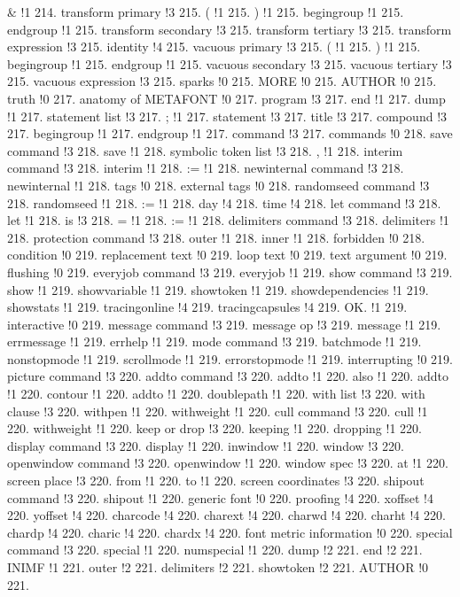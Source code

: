 \& !1 214.
transform primary !3 215.
( !1 215.
) !1 215.
begingroup !1 215.
endgroup !1 215.
transform secondary !3 215.
transform tertiary !3 215.
transform expression !3 215.
identity !4 215.
vacuous primary !3 215.
( !1 215.
) !1 215.
begingroup !1 215.
endgroup !1 215.
vacuous secondary !3 215.
vacuous tertiary !3 215.
vacuous expression !3 215.
sparks !0 215.
MORE !0 215.
AUTHOR !0 215.
truth !0 217.
anatomy of METAFONT !0 217.
program !3 217.
end !1 217.
dump !1 217.
statement list !3 217.
; !1 217.
statement !3 217.
title !3 217.
compound !3 217.
begingroup !1 217.
endgroup !1 217.
command !3 217.
commands !0 218.
save command !3 218.
save !1 218.
symbolic token list !3 218.
, !1 218.
interim command !3 218.
interim !1 218.
:= !1 218.
newinternal command !3 218.
newinternal !1 218.
tags !0 218.
external tags !0 218.
randomseed command !3 218.
randomseed !1 218.
:= !1 218.
day !4 218.
time !4 218.
let command !3 218.
let !1 218.
is !3 218.
= !1 218.
:= !1 218.
delimiters command !3 218.
delimiters !1 218.
protection command !3 218.
outer !1 218.
inner !1 218.
forbidden !0 218.
condition !0 219.
replacement text !0 219.
loop text !0 219.
text argument !0 219.
flushing !0 219.
everyjob command !3 219.
everyjob !1 219.
show command !3 219.
show !1 219.
showvariable !1 219.
showtoken !1 219.
showdependencies !1 219.
showstats !1 219.
tracingonline !4 219.
tracingcapsules !4 219.
OK. !1 219.
interactive !0 219.
message command !3 219.
message op !3 219.
message !1 219.
errmessage !1 219.
errhelp !1 219.
mode command !3 219.
batchmode !1 219.
nonstopmode !1 219.
scrollmode !1 219.
errorstopmode !1 219.
interrupting !0 219.
picture command !3 220.
addto command !3 220.
addto !1 220.
also !1 220.
addto !1 220.
contour !1 220.
addto !1 220.
doublepath !1 220.
with list !3 220.
with clause !3 220.
withpen !1 220.
withweight !1 220.
cull command !3 220.
cull !1 220.
withweight !1 220.
keep or drop !3 220.
keeping !1 220.
dropping !1 220.
display command !3 220.
display !1 220.
inwindow !1 220.
window !3 220.
openwindow command !3 220.
openwindow !1 220.
window spec !3 220.
at !1 220.
screen place !3 220.
from !1 220.
to !1 220.
screen coordinates !3 220.
shipout command !3 220.
shipout !1 220.
generic font !0 220.
proofing !4 220.
xoffset !4 220.
yoffset !4 220.
charcode !4 220.
charext !4 220.
charwd !4 220.
charht !4 220.
chardp !4 220.
charic !4 220.
chardx !4 220.
font metric information !0 220.
special command !3 220.
special !1 220.
numspecial !1 220.
dump !2 221.
end !2 221.
INIMF !1 221.
outer !2 221.
delimiters !2 221.
showtoken !2 221.
AUTHOR !0 221.
